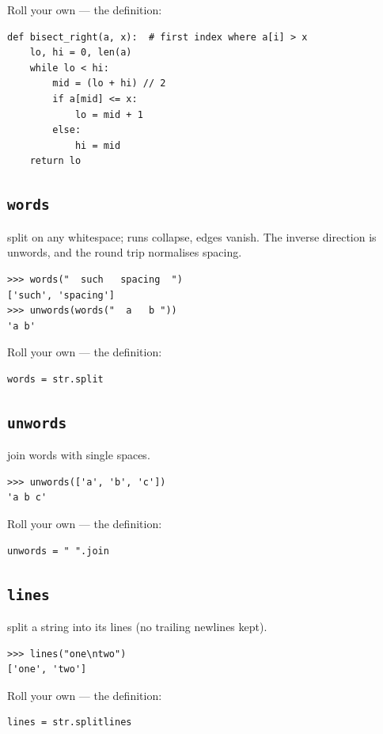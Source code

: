 \documentclass[10pt,letterpaper]{book}
\begin{document}
Roll your own --- the definition:

\begin{lstlisting}[style=ex]
def bisect_right(a, x):  # first index where a[i] > x
    lo, hi = 0, len(a)
    while lo < hi:
        mid = (lo + hi) // 2
        if a[mid] <= x:
            lo = mid + 1
        else:
            hi = mid
    return lo
\end{lstlisting}
\subsection{\texttt{words}}\label{def:words}
split on any whitespace; runs collapse, edges vanish. The inverse direction is unwords, and the round trip normalises spacing.
\begin{lstlisting}[style=ex]
>>> words("  such   spacing  ")
['such', 'spacing']
>>> unwords(words("  a   b "))
'a b'
\end{lstlisting}

Roll your own --- the definition:

\begin{lstlisting}[style=ex]
words = str.split
\end{lstlisting}

\subsection{\texttt{unwords}}\label{def:unwords}
join words with single spaces.
\begin{lstlisting}[style=ex]
>>> unwords(['a', 'b', 'c'])
'a b c'
\end{lstlisting}

Roll your own --- the definition:

\begin{lstlisting}[style=ex]
unwords = " ".join
\end{lstlisting}
\subsection{\texttt{lines}}\label{def:lines}
split a string into its lines (no trailing newlines kept).
\begin{lstlisting}[style=ex]
>>> lines("one\ntwo")
['one', 'two']
\end{lstlisting}

Roll your own --- the definition:

\begin{lstlisting}[style=ex]
lines = str.splitlines
\end{lstlisting}
\end{document}
